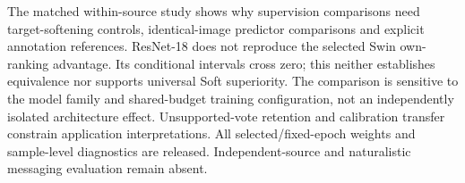 The matched within-source study shows why supervision comparisons need target-softening controls, identical-image predictor comparisons and explicit annotation references. ResNet-18 does not reproduce the selected Swin own-ranking advantage. Its conditional intervals cross zero; this neither establishes equivalence nor supports universal Soft superiority. The comparison is sensitive to the model family and shared-budget training configuration, not an independently isolated architecture effect. Unsupported-vote retention and calibration transfer constrain application interpretations. All selected/fixed-epoch weights and sample-level diagnostics are released. Independent-source and naturalistic messaging evaluation remain absent.
